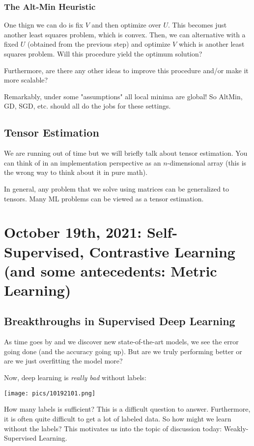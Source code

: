 \documentclass[11pt]{scrartcl}
\begin{document}
\subsubsection{The Alt-Min Heuristic}
One thign we can do is fix $V$ and then optimize over $U$. This becomes just another least squares problem, which is convex. Then, we can alternative with a fixed $U$ (obtained from the previous step) and optimize $V$ which is another least squares problem. Will this procedure yield the optimum solution? 

Furthermore, are there any other ideas to improve this procedure and/or make it more scalable?

Remarkably, under some "assumptions" all local minima are global! So AltMin, GD, SGD, etc. should all do the jobs for these settings. 

\subsection{Tensor Estimation}

We are running out of time but we will briefly talk about tensor estimation. You can think of in an implementation perspective as an $n$-dimensional array (this is the wrong way to think about it in pure math). 

In general, any problem that we solve using matrices can be generalized to tensors. Many ML problems can be viewed as a tensor estimation. 

\newpage
\section{October 19th, 2021: Self-Supervised, Contrastive Learning (and some antecedents: Metric Learning)}

\subsection{Breakthroughs in Supervised Deep Learning}
As time goes by and we discover new state-of-the-art models, we see the error going done (and the accuracy going up). But are we truly performing better or are we just overfitting the model more? 

Now, deep learning is \textit{really bad} without labels: 
\begin{center}
    \texttt{[image: pics/10192101.png]}
\end{center}
How many labels is sufficient? This is a difficult question to answer. Furthermore, it is often quite difficult to get a lot of labeled data. So how might we learn without the labels? This motivates us into the topic of discussion today: Weakly-Supervised Learning.
\end{document}
